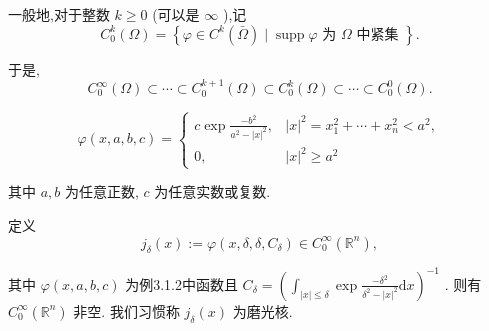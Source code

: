 \documentclass[lang=cn,newtx,10pt,scheme=chinese,thmcnt=chapter]{elegantbook}
\newcommand{\dif}{\mathrm{d}}
\begin{document}
一般地,对于整数 \(k \geq  0\) (可以是 \(\infty\) ),记
\begin{equation*}
{C}_{0}^{k}\left( \Omega \right)  = \left\{  {\varphi  \in  {C}^{k}\left( \bar{\Omega }\right)  \mid  \operatorname{supp}\varphi \text{ 为 }\Omega \text{ 中紧集 }}\right\}  .
\end{equation*}

于是,
\begin{equation*}
{C}_{0}^{\infty }\left( \Omega \right)  \subset  \cdots  \subset  {C}_{0}^{k + 1}\left( \Omega \right)  \subset  {C}_{0}^{k}\left( \Omega \right)  \subset  \cdots  \subset  {C}_{0}^{0}\left( \Omega \right) .
\end{equation*}

\begin{example}
\begin{equation*}
\varphi \left( {x,a,b,c}\right)  = \left\{  \begin{array}{ll} c\exp \frac{-{b}^{2}}{{a}^{2} - {\left| x\right| }^{2}}, & {\left| x\right| }^{2} = {x}_{1}^{2} + \cdots  + {x}_{n}^{2} < {a}^{2}, \\  0, & {\left| x\right| }^{2} \geq  {a}^{2} \end{array}\right.
\end{equation*}

其中 \(a,b\) 为任意正数, \(c\) 为任意实数或复数.

\end{example}

\begin{example}
  定义
\begin{equation}
  {j}_{\delta }\left( x\right)  \mathrel{\text{ := }} \varphi \left( {x,\delta ,\delta ,{C}_{\delta }}\right)  \in  {C}_{0}^{\infty }\left( {\mathbb{R}}^{n}\right) , \label{3.2}
\end{equation}

\end{example}

其中 \(\varphi \left( {x,a,b,c}\right)\) 为例3.1.2中函数且 \({C}_{\delta } = {\left( {\int }_{\left| x\right|  \leqslant  \delta }\exp \frac{-{\delta }^{2}}{{\delta }^{2} - {\left| x\right| }^{2}}\dif x\right) }^{-1}\) . 则有 \({C}_{0}^{\infty }\left( {\mathbb{R}}^{n}\right)\) 非空. 我们习惯称 \({j}_{\delta }\left( x\right)\) 为磨光核.
\end{document}
